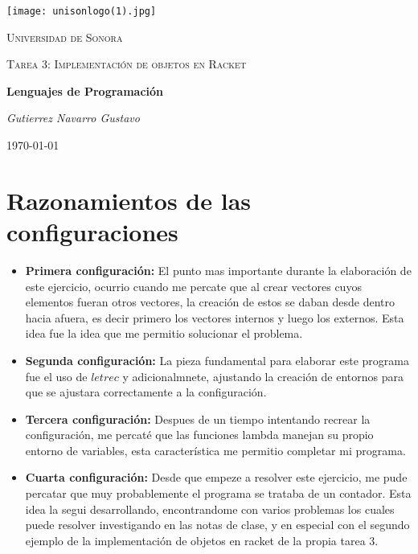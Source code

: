 \documentclass{article}
\begin{document}
\begin{titlepage}
	\centering
	\texttt{[image: unisonlogo(1).jpg]}\par\vspace{1cm}
	{\scshape\LARGE Universidad de Sonora\par}
	\vspace{1cm}
	{\scshape\Large Tarea 3: Implementación de objetos en Racket\par}
	\vspace{1.5cm}
	{\huge\bfseries Lenguajes de Programación\par}
	\vspace{2cm}
	{\Large\itshape Gutierrez Navarro Gustavo\par}
	\vfill
	\vfill
	{\large \today\par}
\end{titlepage}
\section{Razonamientos de las configuraciones}
\begin{itemize}
    \item \textbf{Primera configuración:}
    El punto mas importante durante la elaboración de este ejercicio, ocurrio cuando me percate que al crear vectores cuyos elementos fueran otros vectores, la creación de estos se daban desde dentro hacia afuera, es decir primero los vectores internos y luego los externos. Esta idea fue la idea que me permitio solucionar el problema.

    \item \textbf{Segunda configuración:}
    La pieza fundamental para elaborar este programa fue el uso de $letrec$ y adicionalmnete, ajustando la creación de entornos para que se ajustara correctamente a la configuración.

    \item \textbf{Tercera configuración:}
    Despues de un tiempo intentando recrear la configuración, me percaté que las funciones lambda manejan su propio entorno de variables, esta característica me permitio completar mi programa.

    \item \textbf{Cuarta configuración:}
    Desde que empeze a resolver este ejercicio, me pude percatar que muy probablemente el programa se trataba de un contador. Esta idea la segui desarrollando, encontrandome con varios problemas los cuales puede resolver investigando en las notas de clase, y en especial con el segundo ejemplo de la implementación de objetos en racket de la propia tarea 3. 
\end{itemize}
\end{document}
